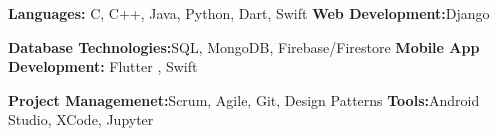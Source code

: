 \vspace{3pt}
\resumeSubHeadingListStart
  \small{
  \skillsHeadingWithContent
  {\textbf{Languages:}{ C, C++, Java, Python, Dart, Swift}}
  {\textbf{Web Development:}{Django}}
  
  \skillsHeadingWithContent
  {\textbf{Database Technologies:}{SQL, MongoDB, Firebase/Firestore}}
  {\textbf{Mobile App Development:}{ Flutter , Swift}}

  \skillsHeadingWithContent
  {\textbf{Project Managemenet:}{Scrum, Agile, Git, Design Patterns}}
  {\textbf{Tools:}{Android Studio, XCode, Jupyter}}
  }
\resumeSubHeadingListEnd